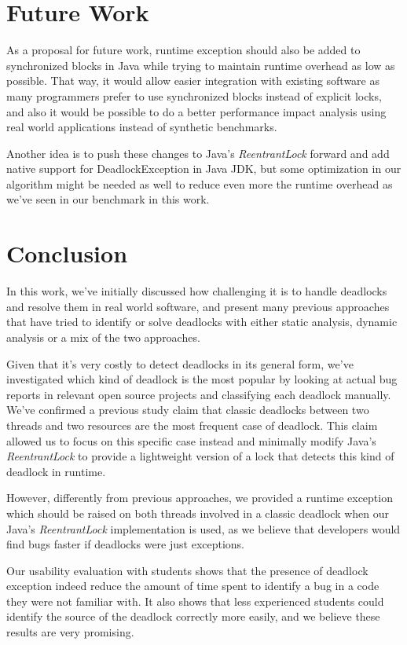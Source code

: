 \section{Future Work}

As a proposal for future work, runtime exception should also be added to synchronized blocks in Java while trying to maintain runtime overhead as low as possible.
That way, it would allow easier integration with existing software as many programmers prefer to use synchronized blocks instead of explicit locks,
and also it would be possible to do a better performance impact analysis using real world applications instead of synthetic benchmarks.

Another idea is to push these changes to Java's \emph{ReentrantLock} forward and add native support for DeadlockException in Java JDK,
but some optimization in our algorithm might be needed as well to reduce even more the runtime overhead as we've seen in our benchmark in this work.

\section{Conclusion}

In this work, we've initially discussed how challenging it is to handle deadlocks and resolve them in real world software, and present many previous approaches that
have tried to identify or solve deadlocks with either static analysis, dynamic analysis or a mix of the two approaches.

Given that it's very costly to detect deadlocks in its general form, we've investigated which kind of deadlock is the most popular by looking at actual bug reports
in relevant open source projects and classifying each deadlock manually. We've confirmed a previous study claim that classic deadlocks between two threads and two resources
are the most frequent case of deadlock. This claim allowed us to focus on this specific case instead and minimally modify Java's \emph{ReentrantLock} to provide a lightweight
version of a lock that detects this kind of deadlock in runtime.

However, differently from previous approaches, we provided a runtime exception which should be raised on both threads involved in a classic deadlock
when our Java's \emph{ReentrantLock} implementation is used, as we believe that developers would find bugs faster if deadlocks were just exceptions.

Our usability evaluation with students shows that the presence of deadlock exception indeed reduce the amount of time spent to identify a bug in a code they were not familiar with. It also shows that less experienced students could identify the source of the deadlock correctly more easily, and we believe these results are very promising.

